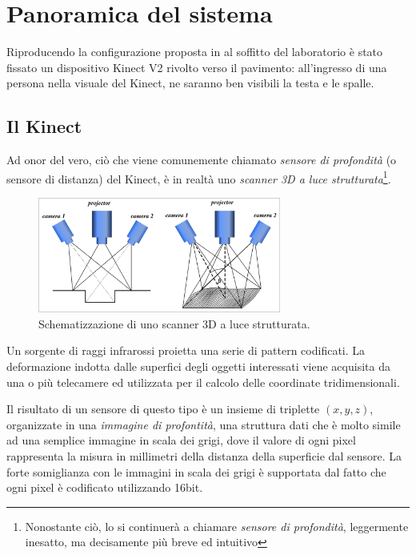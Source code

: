
\chapter{Panoramica del sistema}
\label{cap:overview}
Riproducendo la configurazione proposta in \cite{Zhu13} al soffitto del laboratorio è stato fissato un dispositivo Kinect V2 rivolto verso il pavimento: all'ingresso di una persona nella visuale del Kinect, ne saranno ben visibili la testa e le spalle.

\section{Il Kinect}
\label{sec:sensor}
Ad onor del vero, ciò che viene comunemente chiamato \emph{sensore di profondità} (o sensore di distanza) del Kinect, è in realtà uno \emph{scanner 3D a luce strutturata}\footnote{Nonostante ciò, lo si continuerà a chiamare \emph{sensore di profondità}, leggermente inesatto, ma decisamente più breve ed intuitivo}.
\begin{figure}
    \begin{center}
        \includegraphics[width=8cm]{img/3d-structured-light-scanner.png}
    \end{center}
    \label{fig:structured_light_scanner}
    \caption{Schematizzazione di uno scanner 3D a luce strutturata.}
\end{figure}
Un sorgente di raggi infrarossi proietta una serie di pattern codificati. La deformazione indotta dalle superfici degli oggetti interessati viene acquisita da una o più telecamere ed utilizzata per il calcolo delle coordinate tridimensionali.

Il risultato di un sensore di questo tipo è un insieme di triplette $(x,y,z)$, organizzate in una \emph{immagine di profontità}, una struttura dati che è molto simile ad una semplice immagine in scala dei grigi, dove il valore di ogni pixel rappresenta la misura in millimetri della distanza della superficie dal sensore.
La forte somiglianza con le immagini in scala dei grigi è supportata dal fatto che ogni pixel è codificato utilizzando 16bit.

